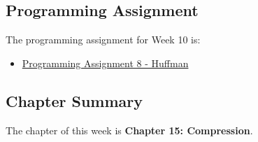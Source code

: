 \subsection{Programming Assignment}

The programming assignment for Week 10 is:

\begin{itemize}
    \item \href{https://github.com/QuantumCompiler/CU/tree/main/CSPB%202270%20-%20Data%20Structures/Assignments/Assignment%208%20-%20Huffman%20Table}{Programming Assignment 8 - Huffman}
\end{itemize}

\newpage

\subsection{Chapter Summary}

The chapter of this week is \textbf{Chapter 15: Compression}.

